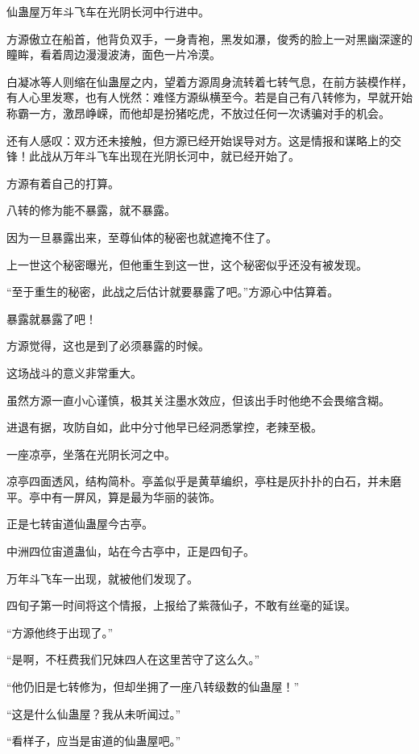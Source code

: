 
\begin{this_body}

仙蛊屋万年斗飞车在光阴长河中行进中。

方源傲立在船首，他背负双手，一身青袍，黑发如瀑，俊秀的脸上一对黑幽深邃的瞳眸，看着周边漫漫波涛，面色一片冷漠。

白凝冰等人则缩在仙蛊屋之内，望着方源周身流转着七转气息，在前方装模作样，有人心里发寒，也有人恍然：难怪方源纵横至今。若是自己有八转修为，早就开始称霸一方，激昂峥嵘，而他却是扮猪吃虎，不放过任何一次诱骗对手的机会。

还有人感叹：双方还未接触，但方源已经开始误导对方。这是情报和谋略上的交锋！此战从万年斗飞车出现在光阴长河中，就已经开始了。

方源有着自己的打算。

八转的修为能不暴露，就不暴露。

因为一旦暴露出来，至尊仙体的秘密也就遮掩不住了。

上一世这个秘密曝光，但他重生到这一世，这个秘密似乎还没有被发现。

“至于重生的秘密，此战之后估计就要暴露了吧。”方源心中估算着。

暴露就暴露了吧！

方源觉得，这也是到了必须暴露的时候。

这场战斗的意义非常重大。

虽然方源一直小心谨慎，极其关注墨水效应，但该出手时他绝不会畏缩含糊。

进退有据，攻防自如，此中分寸他早已经洞悉掌控，老辣至极。

一座凉亭，坐落在光阴长河之中。

凉亭四面透风，结构简朴。亭盖似乎是黄草编织，亭柱是灰扑扑的白石，并未磨平。亭中有一屏风，算是最为华丽的装饰。

正是七转宙道仙蛊屋今古亭。

中洲四位宙道蛊仙，站在今古亭中，正是四旬子。

万年斗飞车一出现，就被他们发现了。

四旬子第一时间将这个情报，上报给了紫薇仙子，不敢有丝毫的延误。

“方源他终于出现了。”

“是啊，不枉费我们兄妹四人在这里苦守了这么久。”

“他仍旧是七转修为，但却坐拥了一座八转级数的仙蛊屋！”

“这是什么仙蛊屋？我从未听闻过。”

“看样子，应当是宙道的仙蛊屋吧。”


\end{this_body}
